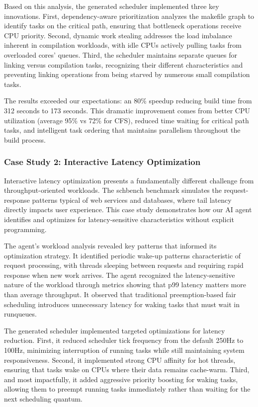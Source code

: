 Based on this analysis, the generated scheduler implemented three key innovations. First, dependency-aware prioritization analyzes the makefile graph to identify tasks on the critical path, ensuring that bottleneck operations receive CPU priority. Second, dynamic work stealing addresses the load imbalance inherent in compilation workloads, with idle CPUs actively pulling tasks from overloaded cores' queues. Third, the scheduler maintains separate queues for linking versus compilation tasks, recognizing their different characteristics and preventing linking operations from being starved by numerous small compilation tasks.

The results exceeded our expectations: an 80\% speedup reducing build time from 312 seconds to 173 seconds. This dramatic improvement comes from better CPU utilization (average 95\% vs 72\% for CFS), reduced time waiting for critical path tasks, and intelligent task ordering that maintains parallelism throughout the build process.

\subsubsection{Case Study 2: Interactive Latency Optimization}

Interactive latency optimization presents a fundamentally different challenge from throughput-oriented workloads. The schbench benchmark simulates the request-response patterns typical of web services and databases, where tail latency directly impacts user experience. This case study demonstrates how our AI agent identifies and optimizes for latency-sensitive characteristics without explicit programming.

The agent's workload analysis revealed key patterns that informed its optimization strategy. It identified periodic wake-up patterns characteristic of request processing, with threads sleeping between requests and requiring rapid response when new work arrives. The agent recognized the latency-sensitive nature of the workload through metrics showing that p99 latency matters more than average throughput. It observed that traditional preemption-based fair scheduling introduces unnecessary latency for waking tasks that must wait in runqueues.

The generated scheduler implemented targeted optimizations for latency reduction. First, it reduced scheduler tick frequency from the default 250Hz to 100Hz, minimizing interruption of running tasks while still maintaining system responsiveness. Second, it implemented strong CPU affinity for hot threads, ensuring that tasks wake on CPUs where their data remains cache-warm. Third, and most impactfully, it added aggressive priority boosting for waking tasks, allowing them to preempt running tasks immediately rather than waiting for the next scheduling quantum.

